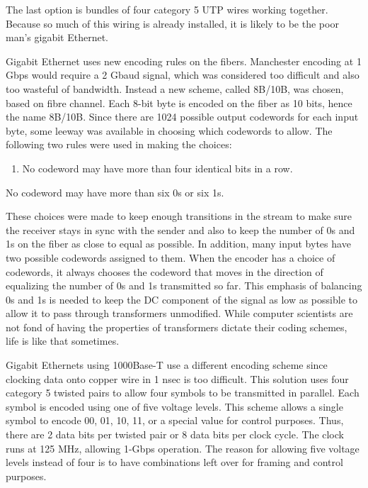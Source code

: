 The last option is bundles of four category 5 UTP wires working
together. Because so much of this wiring is already installed, it is
likely to be the poor man's gigabit Ethernet.

Gigabit Ethernet uses new encoding rules on the fibers. Manchester
encoding at 1 Gbps would require a 2 Gbaud signal, which was considered
too difficult and also too wasteful of bandwidth. Instead a new scheme,
called {8B/10B}, was chosen, based on fibre channel. Each 8-bit byte is
encoded on the fiber as 10 bits, hence the name 8B/10B. Since there are
1024 possible output codewords for each input byte, some leeway was
available in choosing which codewords to allow. The following two rules
were used in making the choices:

{}

\begin{enumerate}
\def\labelenumi{\arabic{enumi}.}
\item
  {}

  No codeword may have more than four identical bits in a row.
\end{enumerate}

{}

No codeword may have more than six 0s or six 1s.

These choices were made to keep enough transitions in the stream to make
sure the receiver stays in sync with the sender and also to keep the
number of 0s and 1s on the fiber as close to equal as possible. In
addition, many input bytes have two possible codewords assigned to them.
When the encoder has a choice of codewords, it always chooses the
codeword that moves in the direction of equalizing the number of 0s and
1s transmitted so far. This emphasis of balancing 0s and 1s is needed to
keep the DC component of the signal as low as possible to allow it to
pass through transformers unmodified. While computer scientists are not
fond of having the properties of transformers dictate their coding
schemes, life is like that sometimes.

Gigabit Ethernets using 1000Base-T use a different encoding scheme since
clocking data onto copper wire in 1 nsec is too difficult. This solution
uses four category 5 twisted pairs to allow four symbols to be
transmitted in parallel. Each symbol is encoded using one of five
voltage levels. This scheme allows a single symbol to encode 00, 01, 10,
11, or a special value for control purposes. Thus, there are 2 data bits
per twisted pair or 8 data bits per clock cycle. The clock runs at 125
MHz, allowing 1-Gbps operation. The reason for allowing five voltage
levels instead of four is to have combinations left over for framing and
control purposes.

